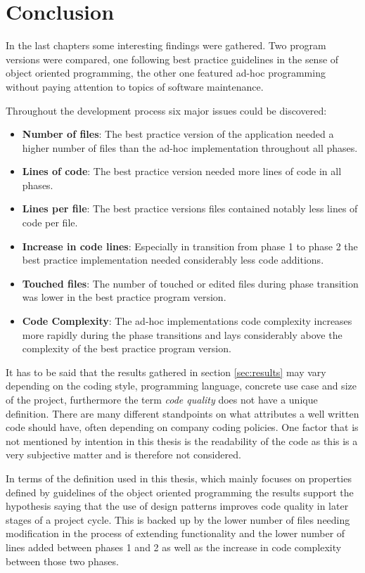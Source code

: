 \chapter{Conclusion}

In the last chapters some interesting findings were gathered. Two program versions were compared, one following best practice guidelines in the sense of object oriented programming, the other one featured ad-hoc programming without paying attention to topics of software maintenance.

Throughout the development process six major issues could be discovered:

\begin{itemize}
	\item \textbf{Number of files}: The best practice version of the application needed a higher number of files than the ad-hoc implementation throughout all phases.
	\item \textbf{Lines of code}: The best practice version needed more lines of code in all phases.
	\item \textbf{Lines per file}: The best practice versions files contained notably less lines of code per file.
	\item \textbf{Increase in code lines}: Especially in transition from phase 1 to phase 2 the best practice implementation needed considerably less code additions.
	\item \textbf{Touched files}: The number of touched or edited files during phase transition was lower in the best practice program version.
	\item \textbf{Code Complexity}: The ad-hoc implementations code complexity increases more rapidly during the phase transitions and lays considerably above the complexity of the best practice program version.
\end{itemize}

It has to be said that the results gathered in section \ref{sec:results} may vary depending on the coding style, programming language, concrete use case and size of the project, furthermore the term \emph{code quality} does not have a unique definition. There are many different standpoints on what attributes a well written code should have, often depending on company coding policies. One factor that is not mentioned by intention in this thesis is the readability of the code as this is a very subjective matter and is therefore not considered. 

In terms of the definition used in this thesis, which mainly focuses on properties defined by guidelines of the object oriented programming the results support the hypothesis saying that the use of design patterns improves code quality in later stages of a project cycle. This is backed up by the lower number of files needing modification in the process of extending functionality and the lower number of lines added between phases 1 and 2 as well as the increase in code complexity between those two phases.

